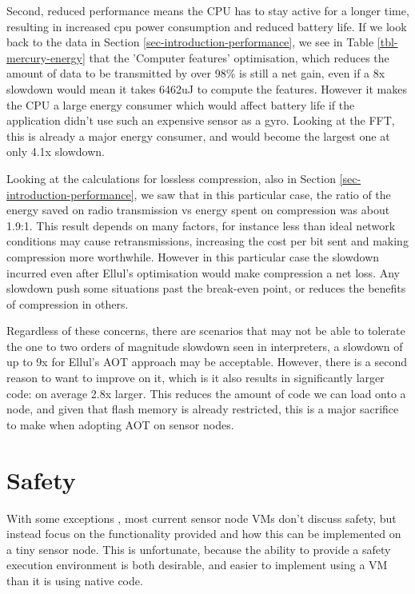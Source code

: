 Second, reduced performance means the CPU has to stay active for a longer time, resulting in increased cpu power consumption and reduced battery life. If we look back to the data in Section \ref{sec-introduction-performance}, we see in Table \ref{tbl-mercury-energy} that the 'Computer features' optimisation, which reduces the amount of data to be transmitted by over 98\% is still a net gain, even if a 8x slowdown would mean it takes 6462uJ to compute the features. However it makes the CPU a large energy consumer which would affect battery life if the application didn't use such an expensive sensor as a gyro. Looking at the FFT, this is already a major energy consumer, and would become the largest one at only 4.1x slowdown.

Looking at the calculations for lossless compression, also in Section \ref{sec-introduction-performance}, we saw that in this particular case, the ratio of the energy saved on radio transmission vs energy spent on compression was about 1.9:1. This result depends on many factors, for instance less than ideal network conditions may cause retransmissions, increasing the cost per bit sent and making compression more worthwhile. However in this particular case the slowdown incurred even after Ellul's optimisation would make compression a net loss. Any slowdown push some situations past the break-even point, or reduces the benefits of compression in others.

Regardless of these concerns, there are scenarios that may not be able to tolerate the one to two orders of magnitude slowdown seen in interpreters, a slowdown of up to 9x for Ellul's AOT approach may be acceptable. However, there is a second reason to want to improve on it, which is it also results in significantly larger code: on average 2.8x larger. This reduces the amount of code we can load onto a node, and given that flash memory is already restricted, this is a major sacrifice to make when adopting AOT on sensor nodes.


\section{Safety}
\label{sec-state-of-the-art-safety}
With some exceptions \cite{Evers:2010ur}, most current sensor node VMs don't discuss safety, but instead focus on the functionality provided and how this can be implemented on a tiny sensor node. This is unfortunate, because the ability to provide a safety execution environment is both desirable, and easier to implement using a VM than it is using native code.

